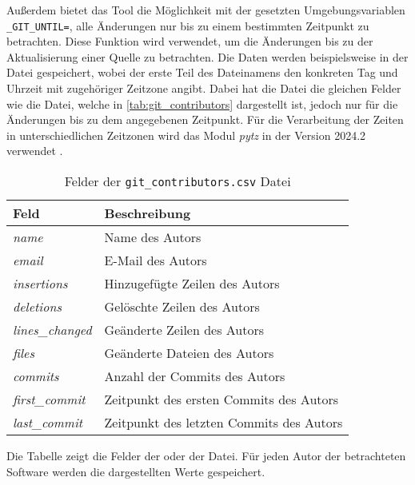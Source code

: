 Außerdem bietet das Tool die Möglichkeit mit der gesetzten Umgebungsvariablen \texttt{\_GIT\_UNTIL=}, alle Änderungen nur bis zu einem bestimmten Zeitpunkt zu betrachten.
Diese Funktion wird verwendet, um die Änderungen bis zu der Aktualisierung einer Quelle zu betrachten.
Die Daten werden beispielsweise in der Datei  gespeichert, wobei der erste Teil des Dateinamens den konkreten Tag und Uhrzeit mit zugehöriger Zeitzone angibt.
Dabei hat die Datei die gleichen Felder wie die  Datei, welche in \autoref{tab:git_contributors} dargestellt ist, jedoch nur für die Änderungen bis zu dem angegebenen Zeitpunkt.
Für die Verarbeitung der Zeiten in unterschiedlichen Zeitzonen wird das Modul \emph{pytz} in der Version 2024.2 verwendet \autocite{bishop_stub42pytz_2024}.

\begin{table}
    \centering
    \setlength{\tabcolsep}{8pt}
    \begin{tabular}{p{3.5cm}|p{10cm}}
        \toprule
        \textbf{Feld} & \textbf{Beschreibung} \\ \midrule
        \emph{name} & Name des Autors \\
        \emph{email} & E-Mail des Autors \\
        \emph{insertions} & Hinzugefügte Zeilen des Autors \\
        \emph{deletions} & Gelöschte Zeilen des Autors \\
        \emph{lines\_changed} & Geänderte Zeilen des Autors \\
        \emph{files} & Geänderte Dateien des Autors \\
        \emph{commits} & Anzahl der Commits des Autors \\
        \emph{first\_commit} & Zeitpunkt des ersten Commits des Autors \\
        \emph{last\_commit} & Zeitpunkt des letzten Commits des Autors \\
        \bottomrule
    \end{tabular}
    \caption{Felder der \texttt{git\_contributors.csv} Datei}
    \label{tab:git_contributors}
    \small
    \raggedright
    Die Tabelle zeigt die Felder der  oder der  Datei. Für jeden Autor der betrachteten Software werden die dargestellten Werte gespeichert.
\end{table}
